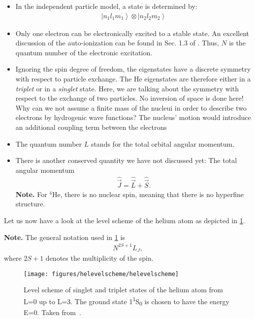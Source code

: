 \documentclass[10pt]{article}
\let\cite\citep
\providecommand\citep{\cite}
\newcommand{\ket}[1]{\ensuremath{\left|#1\right\rangle}}
\newcommand*\ch[1]{\ensuremath{\mathrm{#1}}}
\begin{document}
\begin{itemize}
\item In the independent particle model, a state is determined by:
\begin{align}
\ket{n_1 l_1 m_1} \otimes \ket{n_2 l_2 m_2 }
\end{align}
\item Only one electron can be electronically excited to a stable state. An excellent discussion of the auto-ionization can be found in Sec. 1.3 of \cite{Grynberg_2009}. Thus, $N$ is the quantum number of the electronic excitation.

\item Ignoring the spin degree of freedom, the eigenstates have a discrete symmetry with respect to particle exchange. The \ch{He} eigenstates are therefore either in a \emph{triplet} or in a \emph{singlet} state. Here, we are talking about the symmetry with respect to the exchange of two particles. No inversion of space is done here!
%
Why can we not assume a finite mass of the nucleui in order to describe two electrons by hydrogenic wave functions? The nucleus' motion would introduce an additional coupling term between the electrons
%
\item The quantum number $L$ stands for the total orbital angular momentum.

\item There is another conserved quantity we have not discussed yet: The total angular momentum
\begin{align}
\hat{\vec{J}} = \hat{\vec{L}} + \hat{\vec{S}}.
\end{align}
\textbf{Note.} For \ch{^4He}, there is no nuclear spin, meaning that there is no hyperfine structure.
\end{itemize}

Let us now have a look at the level scheme of the helium atom as depicted in \ref{124335}.

\textbf{Note.} The general notation used in \ref{124335} is
\begin{align}
N^{2S+1}L_J,
\end{align}  
where $2S+1$ denotes the multiplicity of the spin.
\begin{figure}[h!]
\begin{center}
\texttt{[image: figures/helevelscheme/helevelscheme]}
\caption{{Level scheme of singlet and triplet states of the helium atom from L=0
up to L=3. The ground state 1\textsuperscript{1}S\textsubscript{0} is
chosen to have the energy E=0. Taken from~\protect\cite{Demtr_der_2010}.
{\label{124335}}%
}}
\end{center}
\end{figure}
\end{document}
